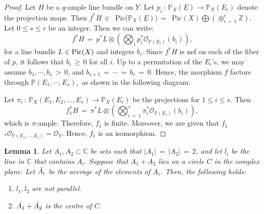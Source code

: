 \documentclass[12pt,reqno]{amsart}
\newtheorem{lemma}{Lemma}[section]
\theoremstyle{definition}
\numberwithin{equation}{section}
\begin{document}
\begin{proof}
Let $H$ be a $q$-ample line bundle on $Y$. Let $p_i\,:\,\mathbb{P}_{X}(\underline{E})\to \mathbb{P}_{X}(E_i)$ denote the projection maps. Then $f^{\ast}H \,\in\, $ Pic($\mathbb{P}_{X}(\underline{E})) \,=\,$ Pic$(X) \bigoplus (\oplus_{i\,=\,1}^{r}\mathbb{Z})$. Let $0\leq s\leq r$ be an integer. Then we can write:
\begin{equation*}
 f^\ast H \,=\, p^{\ast} L \otimes \left(\bigotimes_i p_i^*\mathcal{O}_{\mathbb{P}(E_{i})}(b_{i})\right),
\end{equation*} 
for a line bundle $L\in \textnormal{Pic}(X)$ and integers $b_{i}$. Since $f^{\ast}H$ is nef on each of the fiber of $p$, it follows that $b_{i}\,\geq\,0$ for all $i$. Up to a permutation of the $E_i$'s, we may assume $b_{1},\cdots,b_{s}\, >\, 0$, and $b_{s+1} \,=\, \cdots \,=\, b_{r} \,=\, 0.$ Hence, the morphism $f$ factors through $\mathbb{P}(E_{1},\cdots,E_{s}),$ as shown in the following diagram:  
\begin{center}
\end{center}
Let $\pi_i\,:\,\mathbb{P}_{X}(E_1, E_2,...,E_s)\to \mathbb{P}_{X}(E_i)$ be the projections for $1\leq i\leq s.$ Then
\begin{equation*}
f_{1}^{\ast}H \,=\, \pi^{\ast}L\otimes \left(\bigotimes_{i \,=\, 1}^{s}\pi_i^*\mathcal{O}_{\mathbb{P}(E_{i})}(b_{i})\right), 
\end{equation*}
which is $\pi$-ample. Therefore, $f_{1}$ is finite. Moreover, we are given that $f_{1}$$_{\ast}\mathcal{O}_{\mathbb{P}(E_{1},\cdots,E_{s})}=\mathcal{O}_Y.$ Hence, $f_{1}$ is an isomorphism.
\end{proof}
\begin{lemma}\label{setsum}
Let $A_1,A_2\subset\mathbb{C}$ be sets such that $|A_1|\,=\,|A_2|\,=\,2$, and let $l_i$ be the line in $\mathbb{C}$ that contains $A_i.$ Suppose that $A_1 +A_2$ lies on a circle $C$ in the complex plane. Let $\Bar{A_i}$ be the average of the elements of $A_i$. Then, the following holds:
\begin{enumerate}
\item[$(1)$] $l_1, l_2$ are not parallel.
\item[$(2)$] $\Bar{A_1}+ \Bar{A_2}$ is the centre of $C.$
\end{enumerate}
\end{lemma}
\end{document}
